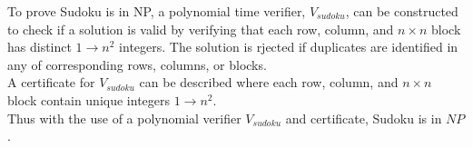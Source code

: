 \documentclass{article}
\begin{document}
To prove Sudoku is in NP, a polynomial time verifier, $V_{sudoku}$, can be constructed to check if a solution is valid by verifying that each row, column, and $n \times n$ block has distinct $1 \rightarrow n^2$ integers. The solution is rjected if duplicates are identified in any of corresponding rows, columns, or blocks.\\

A certificate for $V_{sudoku}$ can be described where each row, column, and $n \times n$ block contain unique integers $1 \rightarrow n^2$.\\

Thus with the use of a polynomial verifier $V_{sudoku}$ and certificate, Sudoku is in $NP$.
\end{document}

